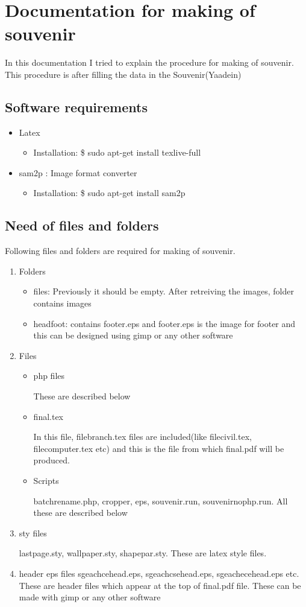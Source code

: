 \documentclass{article}
\begin{document}
\section*{Documentation for making of souvenir}
In this documentation I tried to explain the procedure for making of souvenir. This procedure is after filling the data in the Souvenir(Yaadein)

\subsection*{Software requirements}
\begin{itemize}
\item Latex
\begin{itemize}
\item Installation: \$ sudo apt-get install texlive-full
\end{itemize}
\item sam2p : Image format converter
\begin{itemize}
\item Installation: \$ sudo apt-get install sam2p
\end{itemize}
\end{itemize}

\subsection*{Need of files and folders}
Following files and folders are required for making of souvenir.
\begin{enumerate}
\item Folders
\begin{itemize}
\item files: Previously it should be empty. After retreiving the images, folder contains images
\item headfoot: contains footer.eps and footer.eps is the image for footer and this can be designed using gimp or any other software
\end{itemize}
\item Files
\begin{itemize}
\item php files 

These are described below
\item final.tex

In this file, filebranch.tex files are included(like filecivil.tex, filecomputer.tex etc) and this is the file from which final.pdf will be produced.
\item Scripts

batchrename.php, cropper, eps, souvenir.run, souvenirnophp.run. All these are described below
\end{itemize}
\item sty files

lastpage.sty, wallpaper.sty, shapepar.sty. These are latex style files.
\item header eps files
sgeachcehead.eps, sgeachcsehead.eps, sgeachecehead.eps etc. These are header files which appear at the top of final.pdf file. These can be made with gimp or any other software
 \end{enumerate}
\end{document}
